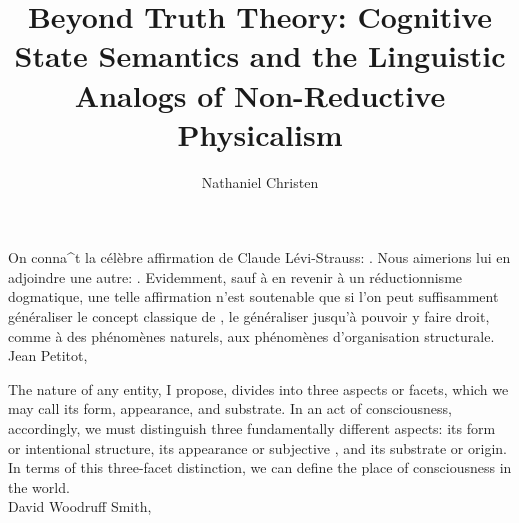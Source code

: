 \documentclass[11pt,twocolumn]{article}
\begin{document}
\title{Beyond Truth Theory: Cognitive State Semantics and the 
Linguistic Analogs of Non-Reductive Physicalism}
\author{Nathaniel Christen}
\newsavebox{\qboxi}
\newsavebox{\qboxii}
\begin{lrbox}{\qboxi}
\begin{frquote}On conna\^{\OldI}t la c\'{e}l\`{e}bre affirmation de Claude L\'{e}vi-Strauss: 
.  Nous aimerions lui en
adjoindre une autre: . 
Evidemment, sauf \`{a} en revenir \`{a} un r\'{e}ductionnisme dogmatique, une telle
affirmation n'est soutenable que si l'on peut suffisamment g\'{e}n\'{e}raliser le concept
classique de , le g\'{e}n\'{e}raliser jusqu'\`{a} pouvoir y faire droit, 
comme \`{a} des ph\'{e}nom\`{e}nes naturels, aux ph\'{e}nom\`{e}nes d'organisation structurale.
\\ \longdash{} Jean Petitot, \cite[p. 1]{PetitotSyntaxe}
\end{frquote}
\end{lrbox}	
\begin{lrbox}{\qboxii}
\begin{frquote}The nature of any entity, I propose, divides into three aspects or facets, which we may call its
	form, appearance, and substrate.  In an act of consciousness, accordingly, we must distinguish
	three fundamentally different aspects: its form or intentional structure, its appearance or
	subjective , and its substrate or origin.  In terms of this three-facet distinction, 
	we can define the place of consciousness in the world.
\\ \longdash{} David Woodruff Smith, \cite[p. 11]{DavidWoodruffSmith}
\end{frquote}
\end{lrbox}	
\twocolumn[\begin{@twocolumnfalse}
\maketitle{}
\begin{abstract}\end{abstract}
\begin{flushright}\usebox{\qboxi}
\usebox{\qboxii}
\end{flushright}
\decoline{}
\vspace{3em}
\end{@twocolumnfalse}]













\end{document}
